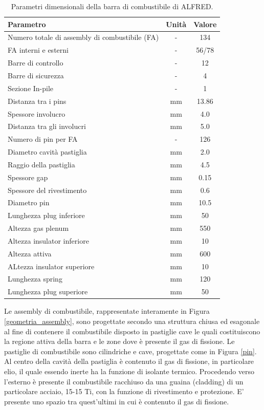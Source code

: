 \begin{table}[!htb]
\small
\centering
 \begin{tabular}{lcc}
\toprule
Parametro & Unità & Valore \\
\midrule
Numero totale di assembly di combustibile (FA) & - & 134\\
FA interni e esterni & - &  56/78 \\
Barre di controllo  & - & 12 \\
Barre di sicurezza  & - & 4 \\
Sezione In-pile & - & 1 \\
Distanza tra i pins & mm & 13.86\\
Spessore involucro & mm & 4.0\\
Distanza tra gli involucri & mm & 5.0\\
Numero di pin per FA & - & 126\\
Diametro cavità pastiglia & mm & 2.0\\
Raggio della pastiglia & mm & 4.5\\ 
Spessore gap & mm & 0.15\\
Spessore del rivestimento & mm & 0.6\\
Diametro pin & mm & 10.5\\
Lunghezza plug inferiore & mm & 50\\
Altezza gas plenum & mm & 550\\
Altezza insulator inferiore  & mm & 10\\
Altezza attiva & mm & 600\\
ALtezza insulator superiore & mm & 10\\
Lunghezza spring & mm & 120\\
Lunghezza plug superiore & mm & 50\\
\bottomrule
\end{tabular}
\caption{Parametri dimensionali della barra di combustibile di ALFRED.}\label{FAtable}
\end{table}
Le assembly di combustibile, rappresentate interamente in Figura 
\ref{geometria_assembly}, sono progettate secondo una struttura chiusa ed 
esagonale al fine di contenere il combustibile disposto in pastiglie cave le 
quali costituiscono la regione attiva della barra e le zone dove è presente il 
gas di fissione.  
Le pastiglie di combustibile sono cilindriche e cave, progettate come in Figura 
\ref{pin}. Al centro della cavità della pastiglia è contenuto il gas di 
fissione, in particolare elio, il quale essendo inerte ha la funzione di 
isolante termico. Procedendo verso l'esterno è presente il combustibile 
racchiuso da una guaina (cladding) di un particolare acciaio, 15-15 Ti, con la 
funzione di rivestimento e protezione. E' presente uno spazio tra quest'ultimi 
in cui è contenuto il gas di fissione.

